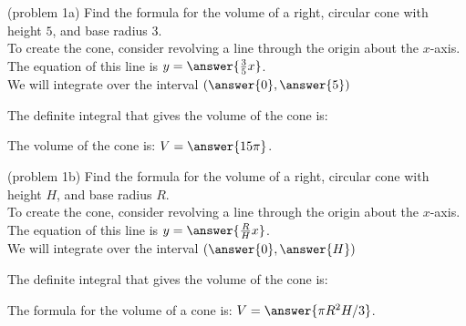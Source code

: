 \documentclass[handout]{ximera}
\begin{document}
\begin{problem}(problem 1a)
Find the formula for the volume of a right, circular cone with height $5$, and base radius $3$.\\

To create the cone, consider revolving a line through the origin about the $x$-axis.\\
The equation of this line is $y = \answer{\frac{3}{5} x}$.\\
We will integrate over the interval $\left(\answer{0},\answer{5}\right)$

The definite integral that gives the volume of the cone is:\\
\begin{multipleChoice}
\end{multipleChoice}

The volume of the cone is: \; $V = \answer{15 \pi }$.










\end{problem}



\begin{problem}(problem 1b)
Find the formula for the volume of a right, circular cone with height $H$, and base radius $R$.\\

To create the cone, consider revolving a line through the origin about the $x$-axis.\\
The equation of this line is $y = \answer{\frac{R}{H} x}$.\\
We will integrate over the interval $\left(\answer{0},\answer{H}\right)$

The definite integral that gives the volume of the cone is:\\
\begin{multipleChoice}
\end{multipleChoice}

The formula for the volume of a cone is: \; $V = \answer{\pi R^2 H/3}$.

\end{problem}
\end{document}
